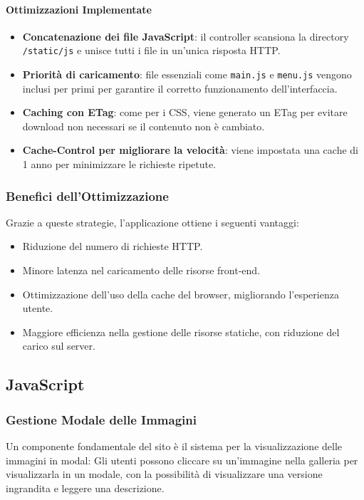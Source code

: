 \paragraph{Ottimizzazioni Implementate}
\begin{itemize}
    \item \textbf{Concatenazione dei file JavaScript}: il controller scansiona la directory \texttt{/static/js} e unisce tutti i file in un'unica risposta HTTP.
    \item \textbf{Priorit\`a di caricamento}: file essenziali come \texttt{main.js} e \texttt{menu.js} vengono inclusi per primi per garantire il corretto funzionamento dell’interfaccia.
    \item \textbf{Caching con ETag}: come per i CSS, viene generato un ETag per evitare download non necessari se il contenuto non \`e cambiato.
    \item \textbf{Cache-Control per migliorare la velocit\`a}: viene impostata una cache di 1 anno per minimizzare le richieste ripetute.
\end{itemize}

\subsubsection{Benefici dell'Ottimizzazione}
Grazie a queste strategie, l’applicazione ottiene i seguenti vantaggi:
\begin{itemize}
    \item Riduzione del numero di richieste HTTP.
    \item Minore latenza nel caricamento delle risorse front-end.
    \item Ottimizzazione dell’uso della cache del browser, migliorando l’esperienza utente.
    \item Maggiore efficienza nella gestione delle risorse statiche, con riduzione del carico sul server.
\end{itemize}


\subsection{JavaScript}
\subsubsection{Gestione Modale delle Immagini}
Un componente fondamentale del sito \`e il sistema per la visualizzazione delle immagini in modal:
Gli utenti possono cliccare su un'immagine nella galleria per visualizzarla in un modale, con la possibilit\`a di visualizzare una versione ingrandita e leggere una descrizione.

